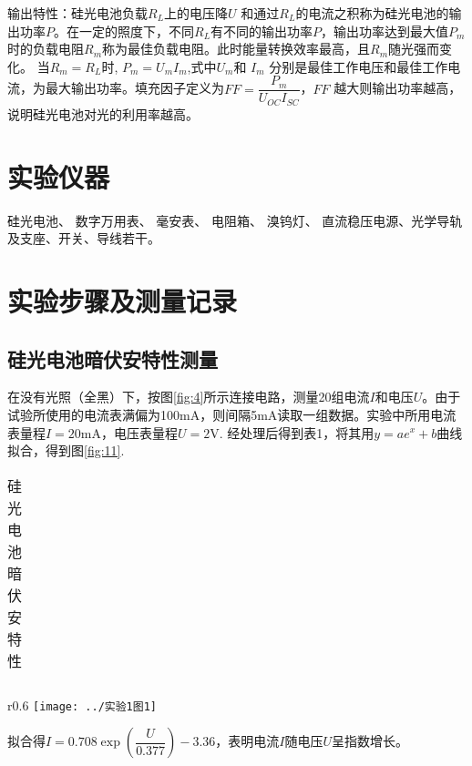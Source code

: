 \documentclass[11pt]{article}
\begin{document}
\heiti 输出特性：\songti 硅光电池负载$  R_L $上的电压降$ U $ 和通过$  R_L $的电流之积称为硅光电池的输出功率$  P  $。在一定的照度下，不同$  R_L $有不同的输出功率$  P  $，输出功率达到最大值$  P_m  $时的负载电阻$  R_m  $称为最佳负载电阻。此时能量转换效率最高，且$ R_m $随光强而变化。 当$ R_m=R_L $时, $ P_m=U_mI_m $,式中$ U_m  $和 $ I_m $ 分别是最佳工作电压和最佳工作电流，为最大输出功率。填充因子定义为$ FF=\dfrac{P_m}{U_{OC}I_{SC}} $，$ FF $ 越大则输出功率越高，说明硅光电池对光的利用率越高。
\section{实验仪器}
硅光电池、 数字万用表、 毫安表、 电阻箱、 溴钨灯、 直流稳压电源、光学导轨及支座、开关、导线若干。
\section{实验步骤及测量记录}
\subsection{硅光电池暗伏安特性测量}
在没有光照（全黑）下，按图\ref{fig:4}所示连接电路，测量20组电流$ I $和电压$ U $。由于试验所使用的电流表满偏为100mA，则间隔5mA读取一组数据。实验中所用电流表量程$ I=20\text{mA} $，电压表量程$ U=2\text{V} $.
经处理后得到表1，将其用$ y=ae^x+b $曲线拟合，得到图\ref{fig:11}.

\begin{table}[htbp]\small
	\label{table1}
	\caption{硅光电池暗伏安特性}
	\begin{tabular}{cccccccccccccc}
	\end{tabular}
\end{table}

\begin{wrapfigure}{r}{0.6\linewidth}
	\centering
	\texttt{[image: ../实验1图1]}
	\caption{硅光电池暗伏安特性曲线}
	\label{fig:11}
\end{wrapfigure}

拟合得$ I=0.708\exp\left( \dfrac{U}{0.377}\right)-3.36  $，表明电流$ I $随电压$ U $呈指数增长。
\end{document}
